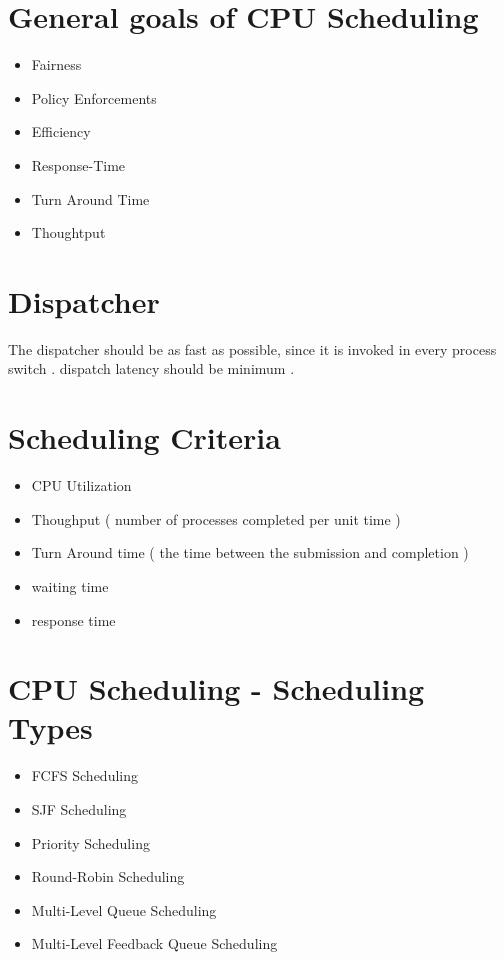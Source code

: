 \documentclass[12pt]{article}
\begin{document}
\section{General goals of CPU Scheduling}


\begin{itemize}
	\item Fairness
	\item Policy Enforcements
	\item Efficiency
	\item Response-Time
	\item Turn Around Time
	\item Thoughtput 
\end{itemize}





\section{Dispatcher}

The dispatcher should be as fast as possible, since it is invoked in every process switch .
\newline\newline
\noindent
dispatch latency should be minimum .




\section{Scheduling Criteria}



\begin{itemize}
	\item CPU Utilization
	\item Thoughput ( number of processes completed per unit time )
	\item Turn Around time ( the time between the submission and completion )
	\item waiting time
	\item response time
\end{itemize}






\section{CPU Scheduling - Scheduling Types}


\begin{itemize}
	\item FCFS Scheduling
	\item SJF Scheduling
	\item Priority Scheduling
	\item Round-Robin Scheduling
	\item Multi-Level Queue Scheduling
	\item Multi-Level Feedback Queue Scheduling 
\end{itemize}
\end{document}
